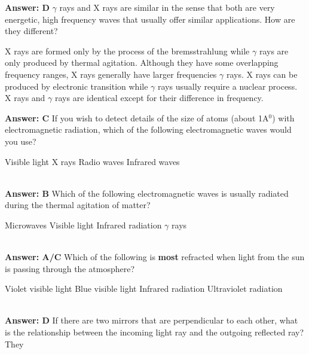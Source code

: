 \documentclass[12pt,addpoints]{exam}
\begin{document}
{{{\begin{questions}
\begin{choices}
					\end{choices} 
					\textbf{Answer: D}
					\question $\gamma$ rays and X rays are similar in the sense that both are very energetic, high frequency waves that usually offer similar applications. How are they different?
					\begin{choices}
						\choice X rays are formed only by the process of the bremsstrahlung while $\gamma$ rays are only produced by thermal agitation.
						\choice Although they have some overlapping frequency ranges, X rays generally have larger frequencies $\gamma$ rays.
						\choice X rays can be produced by electronic transition while $\gamma$ rays usually require a nuclear process.
						\choice X rays and $\gamma$ rays are identical except for their difference in frequency.
					\end{choices}
					\textbf{Answer: C}
					\question If you wish to detect details of the size of atoms (about 1A$^0$) with electromagnetic radiation, which of the following electromagnetic waves would you use? \\
					\begin{oneparchoices}
						\choice Visible light
						\choice X rays
						\choice Radio waves
						\choice Infrared waves
					\end{oneparchoices}
					\\ \textbf{Answer: B}
					\question Which of the following electromagnetic waves is usually radiated during the thermal agitation of matter?\\
					\begin{oneparchoices}
						\choice Microwaves
						\choice Visible light
						\choice Infrared radiation
						\choice $\gamma$ rays
					\end{oneparchoices}
					\\ \textbf{Answer: A/C}
					\question Which of the following is \textbf{most} refracted when light from the sun is passing through the atmosphere? \\
					\begin{oneparchoices}
						\choice Violet visible light
						\choice Blue visible light
						\choice Infrared radiation
						\choice Ultraviolet radiation
					\end{oneparchoices}
					\\ \textbf{Answer: D}
					\question If there are two mirrors that are perpendicular to each other, what is the relationship between the incoming light ray and the outgoing reflected ray? They \\
					\begin{oneparchoices}

\end{oneparchoices}
\end{questions}}}}
\end{document}

